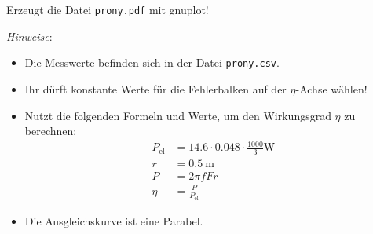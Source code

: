 \documentclass[a4paper, 12pt, headsepline, pagesize, parskip=half-, headlines=3.1]{scrartcl}
\newcounter{aufgabe}
\newenvironment{aufgabe*}[1][]{\stepcounter{aufgabe}
\noindent\textbf{Aufgabe \arabic{aufgabe}.} #1}{\bigskip}
\begin{document}
\begin{aufgabe*}
	Erzeugt die Datei \texttt{prony.pdf} mit gnuplot!
	
	\enlargethispage{\baselineskip}
	\emph{Hinweise}:
	\begin{itemize}
		\item Die Messwerte befinden sich in der Datei \texttt{prony.csv}.
		\item Ihr dürft konstante Werte für die Fehlerbalken auf der $η$-Achse wählen!
		\item Nutzt die folgenden Formeln und Werte, um den Wirkungsgrad $η$ zu berechnen:
		\begin{align*}
			P_\text{el} &= \num{14,6} ⋅ \num{0,048} ⋅ \frac{1000}{3} \si{\W} \\
			r &= \SI{0,5}{\m} \\
			P &= 2πfFr \\
			η &= \frac{P}{P_\text{el}}
		\end{align*}
		\item Die Ausgleichskurve ist eine Parabel.
	\end{itemize}
\end{aufgabe*}
\end{document}
